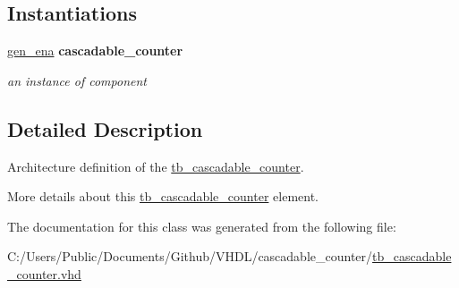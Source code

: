 \subsection*{Instantiations}
 \begin{DoxyCompactItemize}
\item 
\hyperlink{classtb__cascadable__counter_1_1_behavioral_a6ab2b7ae21cf93d9867b638ede4dbb64}{gen\+\_\+ena}  {\bfseries cascadable\+\_\+counter}   \hypertarget{classtb__cascadable__counter_1_1_behavioral_a6ab2b7ae21cf93d9867b638ede4dbb64}{}\label{classtb__cascadable__counter_1_1_behavioral_a6ab2b7ae21cf93d9867b638ede4dbb64}

\begin{DoxyCompactList}\small\item\em an instance of component \end{DoxyCompactList}\end{DoxyCompactItemize}


\subsection{Detailed Description}
Architecture definition of the \hyperlink{classtb__cascadable__counter}{tb\+\_\+cascadable\+\_\+counter}. 

More details about this \hyperlink{classtb__cascadable__counter}{tb\+\_\+cascadable\+\_\+counter} element. 

The documentation for this class was generated from the following file\+:\begin{DoxyCompactItemize}
\item 
C\+:/\+Users/\+Public/\+Documents/\+Github/\+V\+H\+D\+L/cascadable\+\_\+counter/\hyperlink{tb__cascadable__counter_8vhd}{tb\+\_\+cascadable\+\_\+counter.\+vhd}\end{DoxyCompactItemize}
